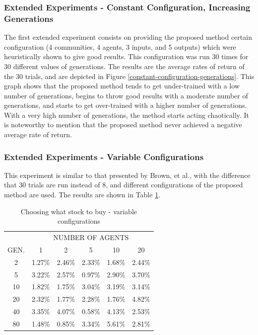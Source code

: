 \documentclass[a4paper,twoside]{article}
\begin{document}
\subsubsection{Extended Experiments - Constant Configuration, Increasing Generations}

The first extended experiment consists on providing the proposed
method certain configuration (4 communities, 4 agents, 3 inputs, and 5
outputs) which were heuristically shown to give good results. This
configuration was run 30 times for 30 different values of 
generations. The results are the average rates of return of the 30
trials, and are depicted in Figure
\ref{constant-configuration-generations}. This graph shows that the
proposed method tends to get under-trained with a low number of
generations, begins to throw good results with a moderate number of
generations, and starts to get over-trained with a higher number of
generations. With a very high number of generations, the method starts
acting chaotically. It is noteworthy to mention that the proposed
method never achieved a negative average rate of return. %

\subsubsection{Extended Experiments - Variable Configurations}

This experiment is similar to that presented by Brown, et al., with
the difference that 30 trials are run instead of 8, and different
configurations of the proposed method are used. The results are shown
in Table \ref{table-rates-of-return}. 

\begin{table}
  \caption{{Choosing what stock to buy - variable configurations}
  }
  \centering
\label{table-rates-of-return}
    \begin{tabular}{ c c c c c c }
         & \multicolumn{5}{c}{NUMBER OF AGENTS} \\ 
        GEN. & 1      & 2      & 5      & 10     & 20     \\
        2       & 1.27\% & 2.46\% & 2.33\% & 1.68\% & 2.44\% \\ 
        5       & 3.22\% & 2.57\% & 0.97\% & 2.90\% & 3.70\% \\ 
        10      & 1.82\% & 1.75\% & 3.04\% & 3.19\% & 3.14\% \\ 
        20      & 2.32\% & 1.77\% & 2.28\% & 1.76\% & 4.82\% \\ 
        40      & 3.35\% & 4.07\% & 0.58\% & 4.13\% & 2.53\% \\ 
        80      & 1.48\% & 0.85\% & 3.34\% & 5.61\% & 2.81\% \\ 
    \end{tabular} 
\end{table}
\end{document}
